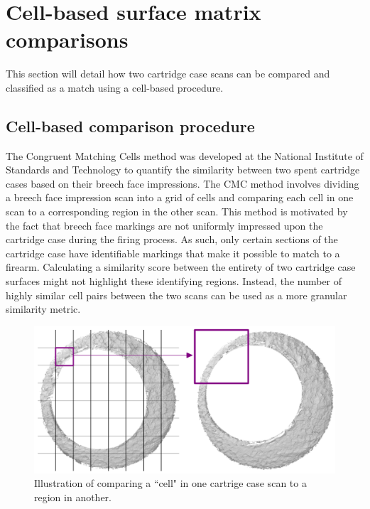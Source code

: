 
\section{Cell-based surface matrix comparisons} \label{matrixComparison}

This section will detail how two cartridge case scans can be compared and classified as a match using a cell-based procedure.

\subsection{Cell-based comparison procedure} \label{cellComparisonProcedure}

The Congruent Matching Cells method was developed at the National Institute of Standards and Technology to quantify the similarity between two spent cartridge cases based on their breech face impressions. The CMC method involves dividing a breech face impression scan into a grid of cells and comparing each cell in one scan to a corresponding region in the other scan. This method is motivated by the fact that breech face markings are not uniformly impressed upon the cartridge case during the firing process. As such, only certain sections of the cartridge case have identifiable markings that make it possible to match to a firearm. Calculating a similarity score between the entirety of two cartridge case surfaces might not highlight these identifying regions. Instead, the number of highly similar cell pairs between the two scans can be used as a more granular similarity metric. 

\begin{figure}[htbp]
  \centering
	\includegraphics[width = \textwidth]{./images/cmc_illustration.png}
	\caption{Illustration of comparing a ``cell" in one cartrige case scan to a region in another.}
 	\label{figure:cmc_illustration}
\end{figure}

